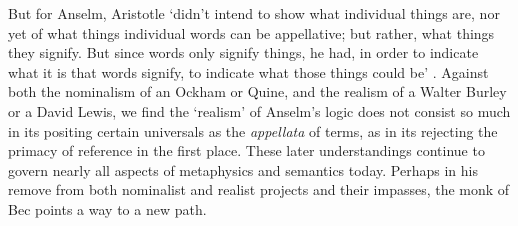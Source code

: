 \documentclass[]{article}
\begin{document}
But for Anselm, Aristotle `didn't intend to show what individual things are, nor yet of what things individual words can be appellative; but rather, what things they signify. But since words only signify things, he had, in order to indicate what it is that words signify, to indicate what those things could be' \cite[DG ch. 17, p. 72, alt.]{Anselm1974}. Against both the nominalism of an Ockham or Quine, and the realism of a Walter Burley or a David Lewis, we find the `realism' of Anselm's logic does not consist so much in its positing certain universals as the \textit{appellata} of terms, as in its rejecting the primacy of reference in the first place. These later understandings continue to govern nearly all aspects of metaphysics and semantics today. Perhaps in his remove from both nominalist and realist projects and their impasses, the monk of Bec points a way to a new path.

\nocite{Anselm1974}
\nocite{Anselm1968}
\nocite{Anselm1990}
\nocite{RSB}
\nocite{BDP}
\nocite{BCP}
\nocite{BC}
\nocite{BDI1}
\nocite{VA}
\nocite{Henry1974}
\nocite{ScotusMetaph}
\nocite{inst.gram.}
\nocite{LanfrancDecreta}
\nocite{PL}
\nocite{AbelardHC}
\nocite{AquinasPA}








\end{document}
